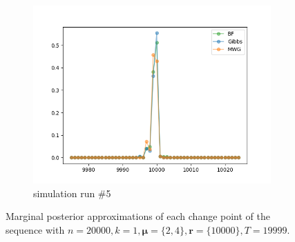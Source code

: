 \begin{figure}[H]
\begin{subfigure}{.3\textwidth}
    	\includegraphics[width=\linewidth]{../../plots/Posterior_post_burnin_M2_N20000_NMCMC3_seed4_diffind2.png}
    	\caption{simulation run \#5}
	\end{subfigure}
	\caption{Marginal posterior approximations of each change point of the sequence with $n=20000, k=1, \bm{\mu}=\{2,4\}, \bm{r}=\{10000\}, T=19999$.}
\end{figure}

